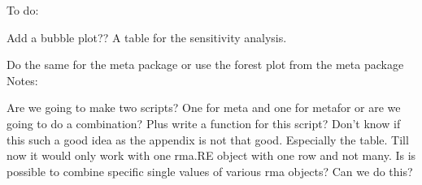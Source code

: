 \documentclass[11pt, a4paper]{article} %
\begin{document}
\bigskip






\begin{table}[ht]
\centering
\caption{Results of the meta-regression (mixed-effects model). The model results are shown taking a moderator into account and displaying the coefficients. Results for the whole model are displayed as Q = Test for residual heterogeneity, $I^2$ = residual heterogeneity and QM = Test of Moderators.} 
{\footnotesize
{}
}
\end{table}




To do:

Add a bubble plot?? A table for the sensitivity analysis. 

Do the same for the meta package or use the forest plot from the meta package\\

Notes:

Are we going to make two scripts? One for meta and one for metafor or are we going to do a combination? Plus write a function for this script? 
Don't know if this such a good idea as the appendix is not that good. Especially the table. Till now it would only work with one rma.RE object with one row and not many. Is is possible to combine specific single values of various rma objects? Can we do this?
\end{document}
